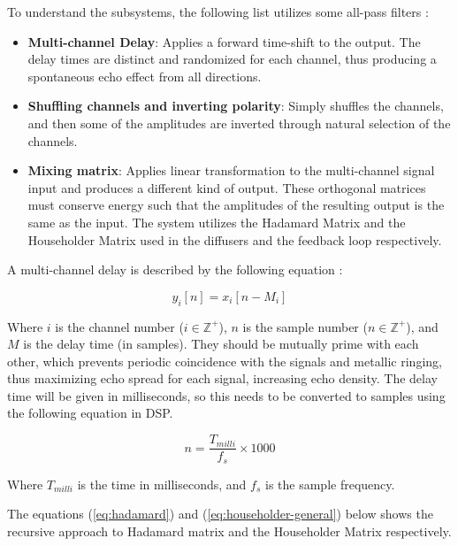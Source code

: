 To understand the subsystems, the following list utilizes some all-pass filters \cite{luff2021reverb}:
\begin{itemize}
    \item \textbf{Multi-channel Delay}: Applies a forward time-shift to the output. The delay times are distinct and randomized
    for each channel, thus producing a spontaneous echo effect from all directions. 
    \item \textbf{Shuffling channels and inverting polarity}: Simply shuffles the channels, and then some of the 
    amplitudes are inverted through natural selection of the channels.
    \item \textbf{Mixing matrix}: Applies linear transformation to the multi-channel signal input and produces
    a different kind of output. These orthogonal matrices must conserve energy such that the amplitudes of the
    resulting output is the same as the input. The system utilizes the Hadamard Matrix \cite{smith2010pasp} 
    and the Householder Matrix \cite{higham2020householder} used in the diffusers and the feedback loop respectively.
\end{itemize}

A multi-channel delay is described by the following equation \cite{smith2010pasp}:

\begin{equation}\label{eq:delay}
y_i[n] = x_i[n - M_i]
\end{equation}


Where $i$ is the channel number ($i \in \mathbb{Z}^{+}$), $n$ is the sample number ($n \in \mathbb{Z}^{+}$), and
$M$ is the delay time (in samples). They should be mutually prime with each other, which prevents periodic coincidence with 
the signals and metallic ringing, thus maximizing echo spread for each signal, increasing echo density. The delay time will 
be given in milliseconds, so this needs to be converted to samples using the following equation in DSP.

\begin{equation}\label{eq:ms_to_samples}
n = \frac{T_{milli}}{f_s} \times 1000
\end{equation}

Where $T_{milli}$ is the time in milliseconds, and $f_s$ is the sample frequency.

The equations (\ref{eq:hadamard}) and (\ref{eq:householder-general}) below shows the recursive approach to Hadamard matrix \cite{smith2010pasp}
and the Householder Matrix \cite{higham2020householder} respectively.

